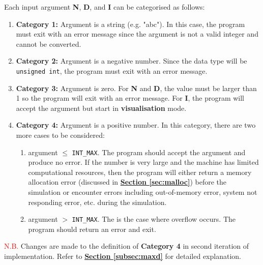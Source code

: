 \documentclass[12pt, a4paper]{article}
\begin{document}
Each input argument \textbf{N}, \textbf{D}, and \textbf{I} can be categorised as follows:
\begin{enumerate}
    \item \textbf{Category 1:} Argument is a string (e.g. "abc"). In this case, the program must
    exit with an error message since the argument is not a valid integer and cannot be converted.
    \item \textbf{Category 2:} Argument is a negative number. Since the data type will be
    \texttt{unsigned int}, the program must exit with an error message.
    \item \textbf{Category 3:} Argument is zero. For \textbf{N} and \textbf{D}, the value must be
    larger than 1 so the program will exit with an error message. For \textbf{I}, the program will
    accept the argument but start in \textbf{visualisation} mode.
    \item \textbf{Category 4:} Argument is a positive number. In this category, there are two more
    cases to be considered:
    \begin{enumerate}
        \item argument $\leq$ \texttt{INT_MAX}. The program should accept the argument and
        produce no error. If the number is very large and the machine has limited computational
        resources, then the program will either return a memory allocation error (discussed in
        \hyperref[sec:malloc]{\textbf{Section \ref*{sec:malloc}}}) before the simulation or
        encounter errors including out-of-memory error, system not responding error, etc. during the
        simulation.
        \item argument $>$ \texttt{INT_MAX}. The is the case where overflow occurs. The
        program should return an error and exit.
    \end{enumerate}
\end{enumerate}

\textcolor{red}{N.B.} Changes are made to the definition of \textbf{Category 4} in second iteration
of implementation. Refer to \hyperref[subsec:maxd]{\textbf{Section \ref*{subsec:maxd}}} for detailed
explanation.
\end{document}
